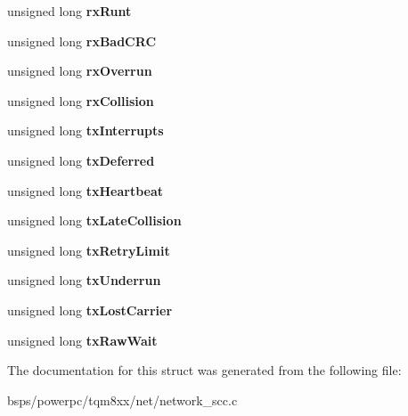 \begin{DoxyCompactItemize}
unsigned long {\bfseries rx\+Runt}
\item 
\mbox{\label{structm8xx__enet__struct_ad7973fbc9c771ac3cfaebf8d9c532fa9}} 
unsigned long {\bfseries rx\+Bad\+C\+RC}
\item 
\mbox{\label{structm8xx__enet__struct_ab66046a2108beabab2ebdf3bf2f26a39}} 
unsigned long {\bfseries rx\+Overrun}
\item 
\mbox{\label{structm8xx__enet__struct_a955a998a3ac3e4739b83afeb6879fe85}} 
unsigned long {\bfseries rx\+Collision}
\item 
\mbox{\label{structm8xx__enet__struct_a320c1d6bcf6c4ca11cd22f2ad5ac3317}} 
unsigned long {\bfseries tx\+Interrupts}
\item 
\mbox{\label{structm8xx__enet__struct_acd7275d0cdbe95fe0570475916839e3f}} 
unsigned long {\bfseries tx\+Deferred}
\item 
\mbox{\label{structm8xx__enet__struct_a5149d0de2a38100ebd94a20e35140495}} 
unsigned long {\bfseries tx\+Heartbeat}
\item 
\mbox{\label{structm8xx__enet__struct_a213800645af8e1e0c675848f6fb1b2ea}} 
unsigned long {\bfseries tx\+Late\+Collision}
\item 
\mbox{\label{structm8xx__enet__struct_a6aaced799c650607214c71006103d003}} 
unsigned long {\bfseries tx\+Retry\+Limit}
\item 
\mbox{\label{structm8xx__enet__struct_a5c481db3ba22fd24dc8e22800866b082}} 
unsigned long {\bfseries tx\+Underrun}
\item 
\mbox{\label{structm8xx__enet__struct_a7b1e2f4b5fa0ed4abc029ba7743f1dcf}} 
unsigned long {\bfseries tx\+Lost\+Carrier}
\item 
\mbox{\label{structm8xx__enet__struct_ac959c3fa4ad79a9c0eb34a19c3c6d570}} 
unsigned long {\bfseries tx\+Raw\+Wait}
\end{DoxyCompactItemize}


The documentation for this struct was generated from the following file\+:\begin{DoxyCompactItemize}
\item 
bsps/powerpc/tqm8xx/net/network\+\_\+scc.\+c\end{DoxyCompactItemize}
